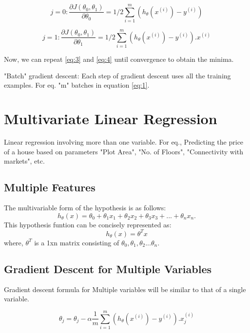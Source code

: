 \documentclass[12pt, A4]{report}
\begin{document}
    \begin{equation} \label {eq:3}
        j = 0 : \frac{\partial {J(\theta_0, \theta_1)}}{\partial \theta_0} = 1/2 \sum_{i=1}^{m} (h_\theta(x^{(i)})-y^{(i)}) 
    \end{equation}

    \begin{equation} \label {eq:4}
        j = 1 : \frac{\partial {J(\theta_0, \theta_1)}}{\partial \theta_1} = 1/2 \sum_{i=1}^{m} (h_\theta(x^{(i)})-y^{(i)}).x^{(i)}
    \end{equation}

    Now, we can repeat \ref{eq:3} and \ref{eq:4} until convergence to obtain the minima.

    "Batch" gradient descent: Each step of gradient descent uses all the training examples.
    For eq. "m" batches in equation \ref{eq:1}.


\section*{Multivariate Linear Regression}
  Linear regression involving more than one variable. For eq., Predicting the price of a house based on parameters "Plot Area", "No. of Floors", "Connectivity with markets", etc.

  \subsection*{Multiple Features}
    The multivariable form of the hypothesis is as follows:
    \begin{equation} \label {eq:5}
        h_\theta(x) = \theta_0 + \theta_1x_1 + \theta_2x_2 + \theta_ 3x_3 + ... + \theta_{n}x_n.    
    \end{equation}
    This hypothesis funtion can be concisely represented as:
    \begin{equation}
        h_\theta(x) = \theta^{T}x
    \end{equation}
    where, $ \theta^T $ is a 1xn matrix consisting of $ \theta_0, \theta_1, \theta_2 ... \theta_n $.


  \subsection*{Gradient Descent for Multiple Variables}
    Gradient descent formula for Multiple variables will be similar to that of a single variable.

    \begin{equation} \label {eq: GD for multiple}
        \theta_j =  \theta_j - \alpha \frac{1}{m} \sum_{i=1}^{m} (h_\theta(x^{(i)})-y^{(i)}).x_j^{(i)}
    \end{equation}
\end{document}
